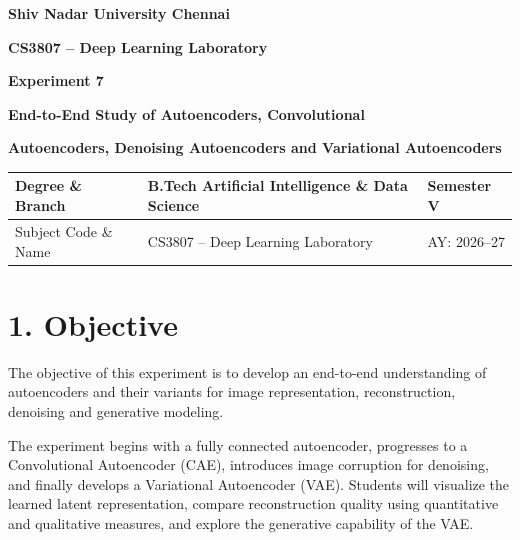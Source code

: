 \documentclass[10pt]{article}
\begin{document}

\begin{center}

{\large\textbf{Shiv Nadar University Chennai}}

\vspace{2mm}

{\normalsize\textbf{CS3807 -- Deep Learning Laboratory}}

\vspace{2mm}

{\large\textbf{Experiment 7}}

\vspace{1mm}

{\normalsize\textbf{End-to-End Study of Autoencoders, Convolutional}}

{\normalsize\textbf{Autoencoders, Denoising Autoencoders and Variational Autoencoders}}

\end{center}

\vspace{3mm}

\begin{tabular}{|p{3.4cm}|p{9.0cm}|p{1.4cm}|}
\hline
Degree \& Branch &
B.Tech Artificial Intelligence \& Data Science &
Semester V\\
\hline
Subject Code \& Name &
CS3807 -- Deep Learning Laboratory &
AY: 2026--27\\
\hline
\end{tabular}

\section*{1. Objective}

The objective of this experiment is to develop an end-to-end understanding of
autoencoders and their variants for image representation, reconstruction,
denoising and generative modeling.

The experiment begins with a fully connected autoencoder, progresses to a
Convolutional Autoencoder (CAE), introduces image corruption for denoising,
and finally develops a Variational Autoencoder (VAE). Students will visualize
the learned latent representation, compare reconstruction quality using
quantitative and qualitative measures, and explore the generative capability
of the VAE.
\end{document}
